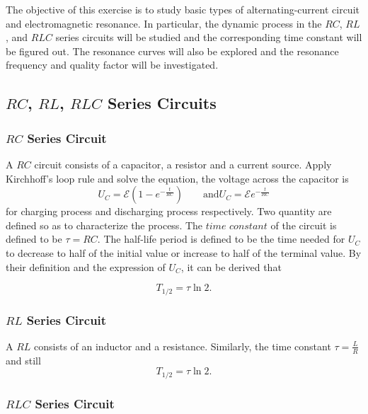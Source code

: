 \documentclass{article}
\begin{document}
The objective of this exercise is to study basic types of alternating-current circuit and electromagnetic resonance. In particular, the dynamic process in the $RC$, $RL$, and $RLC$ series circuits will be studied and the corresponding time constant will be figured out. The resonance curves will also be explored and the resonance frequency and quality factor will be investigated.

\subsection{$RC$, $RL$, $RLC$ Series Circuits}

\subsubsection{$RC$ Series Circuit}

A $RC$ circuit consists of a capacitor, a resistor and a current source. Apply Kirchhoff’s loop rule and solve the equation, the voltage across the capacitor is
$$U_C = \mathcal{E}(1-e^{-\frac{t}{RC}})\hspace{2em} \text{and} U_C = \mathcal{E}e^{-\frac{t}{RC}}$$
for charging process and discharging process respectively.
Two quantity are defined so as to characterize the process. The $\textit{time constant}$ of the circuit is defined to be $\tau = RC$. The half-life period is defined to be the time needed for $U_C$ to decrease to half of the initial value or increase to half of the terminal value. By their definition and the expression of $U_C$, it can be derived that

\begin{equation}
    T_{1/2} = \tau\ln 2.
    \label{eq:ThalfRC}
\end{equation}

\subsubsection{$RL$ Series Circuit}
A $RL$ consists of an inductor and a resistance. Similarly, the time constant $\tau = \frac{L}{R}$
and still
\begin{equation}
    T_{1/2} = \tau\ln 2.
    \label{eq:ThalfRL}
\end{equation}

\subsubsection{$RLC$ Series Circuit}
\end{document}
